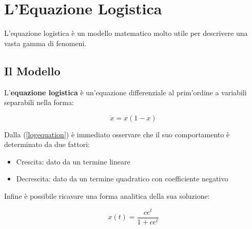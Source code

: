\section{L'Equazione Logistica}

L'equazione logistica è un modello matematico molto utile per descrivere una vasta gamma di fenomeni.

\subsection{Il Modello}

L'\textbf{equazione logistica} è un'equazione differenziale al prim'ordine a variabili separabili nella forma: 

\begin{equation}
	\dot{x}=x(1-x)
	\label{logequation}
\end{equation}

Dalla (\ref{logequation}) è immediato osservare che il suo comportamento è determinato da due fattori:

\begin{itemize}
	\item Crescita: dato da un termine lineare \\
	\item Decrescita: dato da un termine quadratico con coefficiente negativo \\
\end{itemize}

Infine è possibile ricavare una forma analitica della sua soluzione:

\begin{equation}
	x(t)=\frac{ce^t}{1+ce^t}
	\label{logfunction}
\end{equation}

\begin{center}
\end{center}